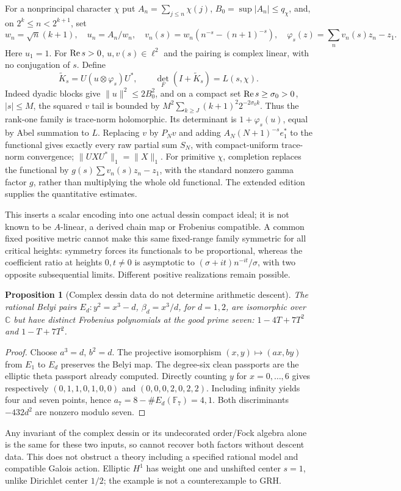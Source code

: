 \documentclass[11pt]{article}
\newtheorem{proposition}[theorem]{Proposition}
\theoremstyle{definition}\newtheorem{definition}[theorem]{Definition}
\theoremstyle{remark}\newtheorem{remark}[theorem]{Remark}
\newcommand{\C}{\mathbb C}\newcommand{\Z}{\mathbb Z}\newcommand{\R}{\mathbb R}
\begin{document}
For a nonprincipal character $\chi$ put $A_n=\sum_{j\le n}\chi(j)$, $B_0=\sup|A_n|\le q_\chi$, and, on $2^k\le n<2^{k+1}$, set
\[
 w_n=\sqrt n(k+1),\quad u_n=A_n/w_n,\quad
 v_n(s)=w_n(n^{-s}-(n+1)^{-s}),\quad
 \varphi_s(z)=\sum_n v_n(s)z_n-z_1.
\]
Here $u_1=1$. For $\operatorname{Re} s>0$, $u,v(s)\in\ell^2$ and the pairing is complex linear, with no conjugation of $s$. Define
\[
 \widetilde K_s=U(u\otimes\varphi_s)U^*,\qquad
 \det_F(I+\widetilde K_s)=L(s,\chi).
\]
Indeed dyadic blocks give $\|u\|^2\le2B_0^2$, and on a compact set $\operatorname{Re} s\ge\sigma_0>0$, $|s|\le M$, the squared $v$ tail is bounded by $M^2\sum_{k\ge J}(k+1)^2 2^{-2\sigma_0k}$. Thus the rank-one family is trace-norm holomorphic. Its determinant is $1+\varphi_s(u)$, equal by Abel summation to $L$. Replacing $v$ by $P_Nv$ and adding $A_N(N+1)^{-s}e_1^*$ to the functional gives exactly every raw partial sum $S_N$, with compact-uniform trace-norm convergence; $\|UXU^*\|_1=\|X\|_1$. For primitive $\chi$, completion replaces the functional by $g(s)\sum v_n(s)z_n-z_1$, with the standard nonzero gamma factor $g$, rather than multiplying the whole old functional. The extended edition supplies the quantitative estimates.

This inserts a scalar encoding into one actual dessin compact ideal; it is not known to be $A$-linear, a derived chain map or Frobenius compatible. A common fixed positive metric cannot make this same fixed-range family symmetric for all critical heights: symmetry forces its functionals to be proportional, whereas the coefficient ratio at heights $0,t\ne0$ is asymptotic to $(\sigma+it)n^{-it}/\sigma$, with two opposite subsequential limits. Different positive realizations remain possible.

\begin{proposition}[Complex dessin data do not determine arithmetic descent]\label{thm:descent}
The rational Belyi pairs $E_d:y^2=x^3-d$, $\beta_d=x^3/d$, for $d=1,2$, are isomorphic over $\C$ but have distinct Frobenius polynomials at the good prime seven: $1-4T+7T^2$ and $1-T+7T^2$.
\end{proposition}
\begin{proof}
Choose $a^3=d$, $b^2=d$. The projective isomorphism $(x,y)\mapsto(ax,by)$ from $E_1$ to $E_d$ preserves the Belyi map. The degree-six clean passports are the elliptic theta passport already computed. Directly counting $y$ for $x=0,\ldots,6$ gives respectively $(0,1,1,0,1,0,0)$ and $(0,0,0,2,0,2,2)$. Including infinity yields four and seven points, hence $a_7=8-\#E_d(\mathbb F_7)=4,1$. Both discriminants $-432d^2$ are nonzero modulo seven.
\end{proof}
Any invariant of the complex dessin or its undecorated order/Fock algebra alone is the same for these two inputs, so cannot recover both factors without descent data. This does not obstruct a theory including a specified rational model and compatible Galois action. Elliptic $H^1$ has weight one and unshifted center $s=1$, unlike Dirichlet center $1/2$; the example is not a counterexample to GRH.
\end{document}
